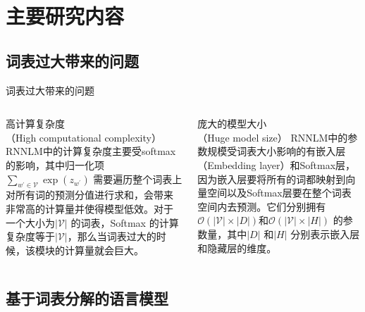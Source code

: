 \documentclass[14pt]{Bredelebeamer}
\begin{document}
\section{主要研究内容}

\subsection{词表过大带来的问题}
\begin{frame}{词表过大带来的问题}
    \begin{columns}
    \begin{column}{.5\textwidth}
        \begin{block}{高计算复杂度\\（High computational complexity）}
        RNNLM中的计算复杂度主要受softmax的影响，其中归一化项${\sum_{w^{'}\in\mathcal{V}} {\exp(z_{w^{'}})}}$ 需要遍历整个词表上对所有词的预测分值进行求和，会带来非常高的计算量并使得模型低效。对于一个大小为${|\mathcal{V}|}$ 的词表，Softmax 的计算复杂度等于${\mathcal{|\mathcal{V}|}}$，那么当词表过大的时候，该模块的计算量就会巨大。

        \end{block}
    \end{column}
    \begin{column}{0.5\textwidth}
        \begin{block}{庞大的模型大小\\（Huge model size）}
        RNNLM中的参数规模受词表大小影响的有嵌入层（Embedding layer）和Softmax层，因为嵌入层要将所有的词都映射到向量空间以及Softmax层要在整个词表空间内去预测。它们分别拥有${\mathcal{O}(|\mathcal{V}| \times |D|)}$和${\mathcal{O}(|\mathcal{V}| \times |H|)}$ 的参数量，其中$|D|$ 和$|H|$ 分别表示嵌入层和隐藏层的维度。

        \end{block}
    \end{column}
    \end{columns}
\end{frame}

\subsection{基于词表分解的语言模型}
\end{document}
